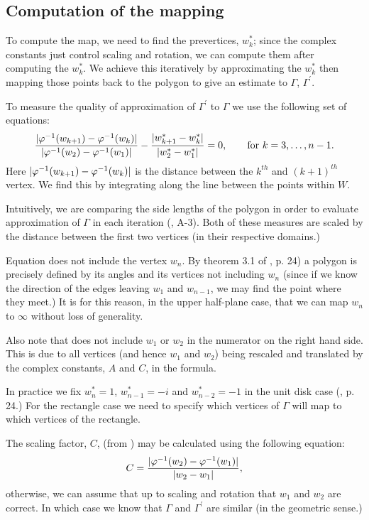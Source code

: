 \subsection{Computation of the \sch mapping}

To compute the map, we need to find the prevertices, $w^*_k$; since the complex constants just control scaling and rotation, we can compute them after computing the $w^*_k$. We achieve this iteratively by approximating the $w^*_k$ then mapping those points back to the polygon to give an estimate to $\Gamma$, $\Gamma^\prime$. 

To measure the quality of approximation of $\Gamma^\prime$ to $\Gamma$ we use the following set of equations:
\begin{equation}
\label{optimizeme}
\frac{\vert \varphi^{-1}(w_{k+1}) -  \varphi^{-1}(w_k) \vert}{\vert \varphi^{-1}(w_2)-\varphi^{-1}(w_1)\vert} - \frac{\vert w^*_{k+1} - w^*_k\vert}{\vert w^*_2 - w^*_1\vert} = 0, \qquad \text{for } k=3,\dots,n-1.
\end{equation}
Here $\vert \varphi^{-1}(w_{k+1}) -  \varphi^{-1}(w_k) \vert$ is the distance between the $k^{th}$ and $(k+1)^{th}$ vertex.  We find this by integrating along the line between the points within $W$.

Intuitively, we are comparing the side lengths of the polygon in order to evaluate approximation of $\Gamma$ in each iteration (\cite{snider}, A-3). Both of these measures are scaled by the distance between the first two vertices (in their respective domains.)

Equation  does not include the vertex $w_n$. By theorem 3.1 of \cite{driscoll}, p. 24) a polygon is precisely defined by its angles and its vertices not including $w_n$ (since if we know the direction of the edges leaving $w_1$ and $w_{n-1}$, we may find the point where they meet.) It is for this reason, in the upper half-plane case, that we can map $w_n$ to $\infty$ without loss of generality.

Also note that  does not include $w_1$ or $w_2$ in the numerator on the right hand side. This is due to all vertices (and hence $w_1$ and $w_2$) being rescaled and translated by the complex constants, $A$ and $C$, in the \sch formula.

In practice we fix $w^*_n=1$, $w^*_{n-1}=-i$ and $w^*_{n-2}=-1$ in the unit disk case (\cite{driscoll}, p. 24.) For the rectangle case we need to specify which vertices of $\Gamma$ will map to which vertices of the rectangle.

The scaling factor, $C$, (from ) may be calculated using the following equation:
\begin{equation}
C=\frac{\vert \varphi^{-1}(w_2)-\varphi^{-1}(w_1)\vert}{\vert w_2 - w_1\vert},
\end{equation}
otherwise, we can assume that up to scaling and rotation that $w_1$ and $w_2$ are correct. In which case we know that $\Gamma$ and $\Gamma^\prime$ are similar (in the geometric sense.) 

